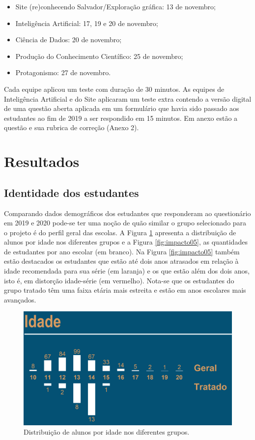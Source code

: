\documentclass[
]{book}
\providecommand{\tightlist}{%
  \setlength{\itemsep}{0pt}\setlength{\parskip}{0pt}}
\begin{document}
\begin{itemize}
\tightlist
\item
  Site (re)conhecendo Salvador/Exploração gráfica: 13 de novembro;
\item
  Inteligência Artificial: 17, 19 e 20 de novembro;
\item
  Ciência de Dados: 20 de novembro;
\item
  Produção do Conhecimento Científico: 25 de novembro;
\item
  Protagonismo: 27 de novembro.
\end{itemize}

Cada equipe aplicou um teste com duração de 30 minutos. As equipes de Inteligência Artificial e do Site aplicaram um teste extra contendo a versão digital de uma questão aberta aplicada em um formulário que havia sido passado aos estudantes ao fim de 2019 a ser respondido em 15 minutos. Em anexo estão a questão e sua rubrica de correção (Anexo 2).

\hypertarget{resultados}{%
\section{Resultados}\label{resultados}}

\hypertarget{identidade-dos-estudantes}{%
\subsection{Identidade dos estudantes}\label{identidade-dos-estudantes}}

Comparando dados demográficos dos estudantes que responderam ao questionário em 2019 e 2020 pode-se ter uma noção de quão similar o grupo selecionado para o projeto é do perfil geral das escolas. A Figura \ref{fig:impacto04} apresenta a distribuição de alunos por idade nos diferentes grupos e a Figura \ref{fig:impacto05}, as quantidades de estudantes por ano escolar (em branco). Na Figura \ref{fig:impacto05} também estão destacados os estudantes que estão até dois anos atrasados em relação à idade recomendada para sua série (em laranja) e os que estão além dos dois anos, isto é, em distorção idade-série (em vermelho). Nota-se que os estudantes do grupo tratado têm uma faixa etária mais estreita e estão em anos escolares mais avançados.

\begin{figure}

{\centering \includegraphics[width=0.75\linewidth,height=0.75\textheight]{images/Impactos/04} 

}

\caption{Distribuição de alunos por idade nos diferentes grupos.}\label{fig:impacto04}
\end{figure}
\end{document}

